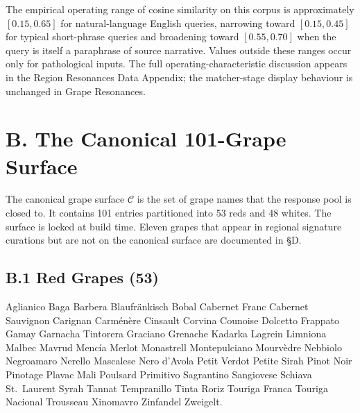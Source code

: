 \documentclass[11pt]{article}
\begin{document}
The empirical operating range of cosine similarity on this corpus is approximately $[0.15, 0.65]$ for natural-language English queries, narrowing toward $[0.15, 0.45]$ for typical short-phrase queries and broadening toward $[0.55, 0.70]$ when the query is itself a paraphrase of source narrative. Values outside these ranges occur only for pathological inputs. The full operating-characteristic discussion appears in the Region Resonances Data Appendix; the matcher-stage display behaviour is unchanged in Grape Resonances.

\section*{B. The Canonical 101-Grape Surface}

The canonical grape surface $\mathcal{C}$ is the set of grape names that the response pool is closed to. It contains 101 entries partitioned into 53 reds and 48 whites. The surface is locked at build time. Eleven grapes that appear in regional signature curations but are not on the canonical surface are documented in \S D.

\subsection*{B.1 Red Grapes (53)}

\begin{small}
\noindent
Aglianico \textperiodcentered{} Baga \textperiodcentered{} Barbera \textperiodcentered{} Blaufr\"ankisch \textperiodcentered{} Bobal \textperiodcentered{} Cabernet Franc \textperiodcentered{} Cabernet Sauvignon \textperiodcentered{} Carignan \textperiodcentered{} Carm\'en\`ere \textperiodcentered{} Cinsault \textperiodcentered{} Corvina \textperiodcentered{} Counoise \textperiodcentered{} Dolcetto \textperiodcentered{} Frappato \textperiodcentered{} Gamay \textperiodcentered{} Garnacha Tintorera \textperiodcentered{} Graciano \textperiodcentered{} Grenache \textperiodcentered{} Kadarka \textperiodcentered{} Lagrein \textperiodcentered{} Limniona \textperiodcentered{} Malbec \textperiodcentered{} Mavrud \textperiodcentered{} Menc\'ia \textperiodcentered{} Merlot \textperiodcentered{} Monastrell \textperiodcentered{} Montepulciano \textperiodcentered{} Mourv\`edre \textperiodcentered{} Nebbiolo \textperiodcentered{} Negroamaro \textperiodcentered{} Nerello Mascalese \textperiodcentered{} Nero d'Avola \textperiodcentered{} Petit Verdot \textperiodcentered{} Petite Sirah \textperiodcentered{} Pinot Noir \textperiodcentered{} Pinotage \textperiodcentered{} Plavac Mali \textperiodcentered{} Poulsard \textperiodcentered{} Primitivo \textperiodcentered{} Sagrantino \textperiodcentered{} Sangiovese \textperiodcentered{} Schiava \textperiodcentered{} St.~Laurent \textperiodcentered{} Syrah \textperiodcentered{} Tannat \textperiodcentered{} Tempranillo \textperiodcentered{} Tinta Roriz \textperiodcentered{} Touriga Franca \textperiodcentered{} Touriga Nacional \textperiodcentered{} Trousseau \textperiodcentered{} Xinomavro \textperiodcentered{} Zinfandel \textperiodcentered{} Zweigelt.
\end{small}
\end{document}
